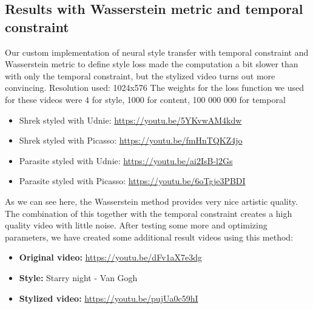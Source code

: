 \subsection{Results with Wasserstein metric and temporal constraint}
\label{sec:Results with wasserstein metric}
Our custom implementation of neural style transfer with temporal constraint and Wasserstein metric to define style loss made the computation a bit slower than with only the temporal constraint, but the stylized video turns out more convincing. \newline
Resolution used: 1024x576
The weights for the loss function we used for these videos were 4 for style, 1000 for content, 100 000 000 for temporal

\begin{itemize}
\item{Shrek styled with Udnie: \url{https://youtu.be/5YKvwAM4kdw}}
\item{Shrek styled with Picasso: \url{https://youtu.be/fmHnTQKZ4jo}}
\item{Parasite styled with Udnie: \url{https://youtu.be/ai2IsB-l2Gs}}
\item{Parasite styled with Picasso: \url{https://youtu.be/6oTgje3PBDI}}
\end{itemize} 
As we can see here, the Wasserstein method provides very nice artistic quality. The combination of this together with the temporal constraint creates a high quality video with little noise. After testing some more and optimizing parameters, we have created some additional result videos using this method:\newline
\begin{itemize}
    \item{\textbf{Original video: }\url{https://youtu.be/dFv1aX7e3dg}}
    \item{\textbf{Style:} Starry night - Van Gogh}
    \item{\textbf{Stylized video:} \url{https://youtu.be/pujUa0c59hI}}
\end{itemize}